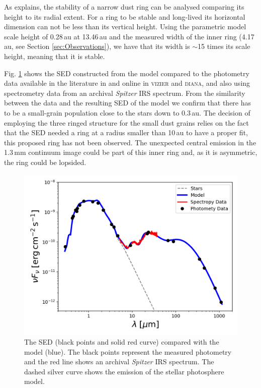 \documentclass[letters, usenatbib]{mnras}
\begin{document}
As \citet{2018ApJ...869L..46D} explains, the stability of a narrow dust ring can be analysed comparing its height to its radial extent. For a ring to be stable and long-lived its horizontal dimension can not be less than its vertical height. Using the parametric model scale height of 0.28\,au at 13.46\,au and the measured width of the inner ring (4.17\,au, see Section \ref{sec:Observations}), we have that its width is $\sim$15 times its scale height, meaning that it is stable.

Fig. \ref{fig:SED} shows the SED constructed from the model compared to the photometry data available in the literature in \citet{Jensen_97} and online in \textsc{vizier} and \textsc{diana}, and also using spectrometry data from an archival \textit{Spitzer} IRS spectrum. From the similarity between the data and the resulting SED of the model we confirm that there has to be a small-grain population close to the stars down to 0.3\,au. The decision of employing the three ringed structure for the small dust grains relies on the fact that the SED needed a ring at a radius smaller than 10\,au to have a proper fit, this proposed ring has not been observed. The unexpected central emission in the 1.3\,mm continuum image could be part of this inner ring and, as it is asymmetric, the ring could be lopsided.

\begin{figure}
	\centering
	\includegraphics[width=\columnwidth]{SED_.png}
    \caption{The SED (black points and solid red curve) compared with the model (blue). The black points represent the measured photometry and the red line shows an archival \textit{Spitzer} IRS spectrum. The dashed silver curve shows the emission of the stellar photosphere model.}
    \label{fig:SED}
\end{figure}
\end{document}
